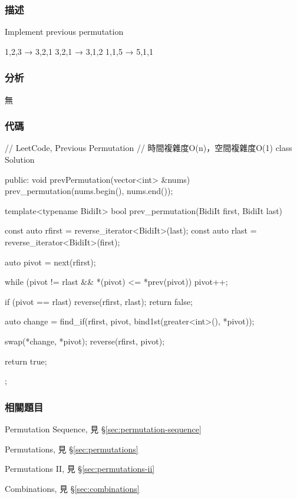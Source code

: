 \subsubsection{描述}
Implement previous permutation

\begin{Code}
1,2,3 → 3,2,1
3,2,1 → 3,1,2
1,1,5 → 5,1,1
\end{Code}


\subsubsection{分析}
無

\subsubsection{代碼}
\begin{Code}
// LeetCode, Previous Permutation
// 時間複雜度O(n)，空間複雜度O(1)
class Solution {
public:
    void prevPermutation(vector<int> &nums) {
        prev_permutation(nums.begin(), nums.end());
    }

    template<typename BidiIt>
    bool prev_permutation(BidiIt first, BidiIt last) {
        const auto rfirst = reverse_iterator<BidiIt>(last);
        const auto rlast = reverse_iterator<BidiIt>(first);

        auto pivot = next(rfirst);

        while (pivot != rlast && *(pivot) <= *prev(pivot))
            pivot++;

        if (pivot == rlast) {
            reverse(rfirst, rlast);
            return false;
        }

        auto change = find_if(rfirst, pivot, bind1st(greater<int>(), *pivot));

        swap(*change, *pivot);
        reverse(rfirst, pivot);

        return true;
    }
};
\end{Code}


\subsubsection{相關題目}
\begindot
\item Permutation Sequence, 見 \S \ref{sec:permutation-sequence}
\item Permutations, 見 \S \ref{sec:permutations}
\item Permutations II, 見 \S \ref{sec:permutations-ii}
\item Combinations, 見 \S \ref{sec:combinations}
\myenddot

